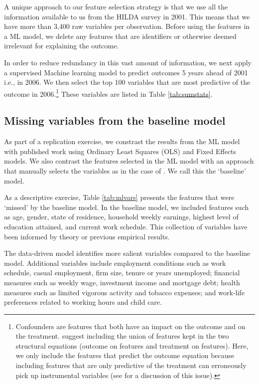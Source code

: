 \documentclass[12pt, a4paper]{article}
\begin{document}
A unique approach to our feature selection strategy is that we use all the
information available to us from the HILDA survey in 2001. This means that we
have more than 3,400 raw variables per observation. Before using the features
in a ML model, we delete any features that are identifiers or otherwise deemed
irrelevant for explaining the outcome.

In order to reduce redundancy in this vast amount of information, we next apply a supervised Machine learning model to predict outcomes 5 years ahead of 2001 i.e., in 2006. We then select the top 100 variables that are most predictive of the outcome in 2006.\footnote{Confounders are features that both have an impact on the outcome and on the treatment. \cite{cherno2018} suggest including the union of features kept in the two structural equations (outcome on features and treatment on features). Here, we only include the features that predict the outcome equation because including features that are only predictive of the treatment can erroneously pick up instrumental variables (see \cite{pearl2012class} for a discussion of this issue). } These variables are listed in Table \ref{tab:sumstats}. 

\subsection{Missing variables from the baseline model}

As part of a replication exercise, we constrast the results from the ML model with published work using Ordinary Least Squares (OLS) and Fixed Effects models. We also contrast the features selected in the ML model with an approach that manually selects the variables as in the case of \cite{chesters2015}. We call this the `baseline' model.

As a descriptive exercise, Table \ref{tab:mlvars} presents the features that were `missed' by the baseline model. In the baseline model, we included features such as age, gender, state of residence, household weekly earnings, highest level of education attained, and current work schedule. This collection of variables have been informed by theory or previous empirical results.  

The data-driven model identifies more salient variables compared to the baseline model. Additional variables include employment conditions such as work schedule, casual employment, firm size, tenure or years unemployed; financial measures such as weekly wage, investment income and mortgage debt; health measures such as limited vigorous activity and tobacco expenses; and work-life preferences related to working hours and child care. 
\end{document}
